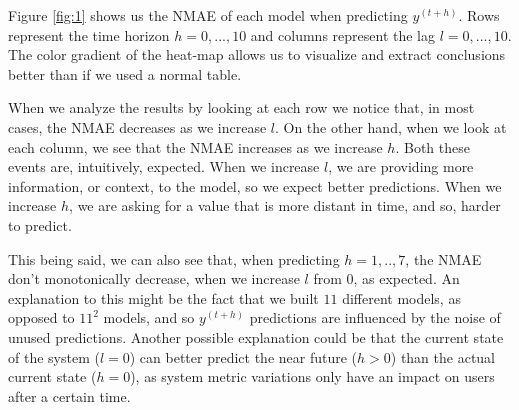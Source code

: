 \documentclass[10pt]{article}
\begin{document}
Figure \ref{fig:1} shows us the \textsc{NMAE} of each model when predicting $y^{(t+h)}$. Rows represent the time horizon $h = 0,...,10$ and columns represent the lag $l = 0,...,10$. The color gradient of the heat-map allows us to visualize and extract conclusions better than if we used a normal table.

When we analyze the results by looking at each row we notice that, in most cases, the \textsc{NMAE} decreases as we increase $l$. On the other hand, when we look at each column, we see that the \textsc{NMAE} increases as we increase $h$. Both these events are, intuitively, expected. When we increase $l$, we are providing more information, or context, to the model, so we expect better predictions. When we increase $h$, we are asking for a value that is more distant in time, and so, harder to predict.

This being said, we can also see that, when predicting $h = 1,..,7$, the \textsc{NMAE} don't monotonically decrease, when we increase $l$ from $0$, as expected. An explanation to this might be the fact that we built $11$ different models, as opposed to $11^2$ models, and so $y^{(t+h)}$ predictions are influenced by the noise of unused predictions. Another possible explanation could be that the current state of the system ($l=0$) can better predict the near future ($h>0$) than the actual current state ($h=0$), as system metric variations only have an impact on users after a certain time.


\printbibliography
\end{document}
